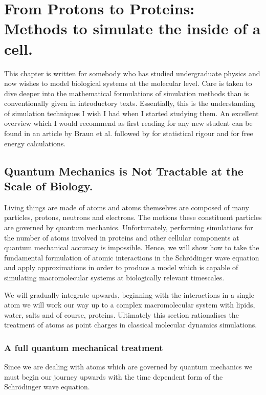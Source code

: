 \chapter{From Protons to Proteins: Methods to simulate the inside of a cell.}
\label{chap:methods}

This chapter is written for somebody who has studied undergraduate physics and now wishes to model biological systems at the molecular level. Care is taken to dive deeper into the mathematical formulations of simulation methods than is conventionally given in introductory texts. Essentially, this is the understanding of simulation techniques I wish I had when I started studying them. An excellent overview which I would recommend as first reading for any new student can be found in an article by Braun et al. \cite{braun2019} followed by \cite{gapsys2020} for statistical rigour and \cite{pohorille2010} for free energy calculations.  

\section{Quantum Mechanics is Not Tractable at the Scale of Biology.}
Living things are made of atoms and atoms themselves are composed of many particles, protons, neutrons and electrons. The motions these constituent particles are governed by quantum mechanics. Unfortunately, performing simulations for the number of atoms involved in proteins and other cellular components at quantum mechanical accuracy is impossible. Hence, we will show how to take the fundamental formulation of atomic interactions in the Schr\"{o}dinger wave equation and apply approximations in order to produce a model which is capable of simulating macromolecular systems at biologically relevant timescales. 

We will gradually integrate upwards, beginning with the interactions in a single atom we will work our way up to a complex macromolecular system with lipids, water, salts and of course, proteins. Ultimately this section rationalises the treatment of atoms as point charges in classical molecular dynamics simulations. 

\subsection{A full quantum mechanical treatment}
Since we are dealing with atoms which are governed by quantum mechanics we must begin our journey upwards with the time dependent form of the Schr\"{o}dinger wave equation. 

